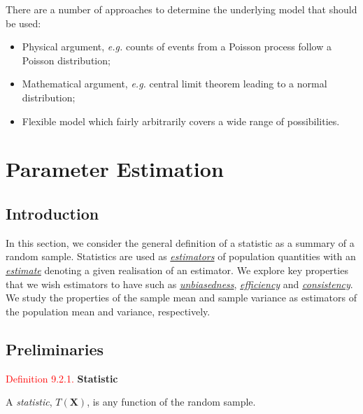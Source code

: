 \documentclass[
]{book}
\providecommand{\tightlist}{%
  \setlength{\itemsep}{0pt}\setlength{\parskip}{0pt}}
\begin{document}
There are a number of approaches to determine the underlying model that should be used:

\begin{itemize}
\tightlist
\item
  Physical argument, \emph{e.g.} counts of events from a Poisson process follow a Poisson distribution;\\
\item
  Mathematical argument, \emph{e.g.} central limit theorem leading to a normal distribution;\\
\item
  Flexible model which fairly arbitrarily covers a wide range of possibilities.
\end{itemize}

\hypertarget{paraestimate}{%
\chapter{Parameter Estimation}\label{paraestimate}}

\hypertarget{paraestimate:intro}{%
\section{Introduction}\label{paraestimate:intro}}

In this section, we consider the general definition of a statistic as a summary of a random sample. Statistics are used as \protect\hyperlink{paraestimate:def:estimator}{\emph{estimators}} of population quantities with an \protect\hyperlink{paraestimate:def:estimate}{\emph{estimate}} denoting a given realisation of an estimator. We explore key properties that we wish estimators to have such as \protect\hyperlink{paraestimate:def:def_unbiased}{\emph{unbiasedness}}, \protect\hyperlink{paraestimate:def:efficient}{\emph{efficiency}} and \protect\hyperlink{paraestimate:def:consistent}{\emph{consistency}}. We study the properties of the sample mean and sample variance as estimators of the population mean and variance, respectively.

\hypertarget{paraestimate:prelim}{%
\section{Preliminaries}\label{paraestimate:prelim}}

\leavevmode{}%
\textcolor{red}{Definition 9.2.1.}
{\textbf{Statistic}}

A \emph{statistic}, \(T(\mathbf{X})\), is any function of the random sample.
\end{document}

